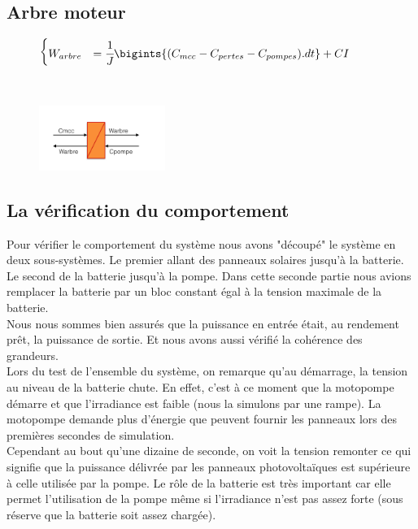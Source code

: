 \subsection{Arbre moteur}
\vspace{-10px}
\begin{figure}[ht]
\centering
\begin{minipage}{.5\textwidth}  
\centering
$\begin{cases}
	 W_{arbre} &= \cfrac{1}{J}\bigints{(C_{mcc}-C_{pertes}-C_{pompes}).dt}+CI
\end{cases}$
\end{minipage}~
\begin{minipage}{.5\textwidth}
  \centering
\includegraphics[height=80px]{images/arbre.png}
\end{minipage}
\end{figure}
\FloatBarrier
\vspace{-20px}


\subsection{La vérification du comportement}

Pour vérifier le comportement du système nous avons "découpé" le système en deux sous-systèmes. Le premier allant des panneaux solaires jusqu'à la batterie. Le second de la batterie jusqu'à la pompe. Dans cette seconde partie nous avions remplacer la batterie par un bloc constant égal à la tension maximale de la batterie.\\
Nous nous sommes bien assurés que la puissance en entrée était, au rendement prêt, la puissance de sortie. Et nous avons aussi vérifié la cohérence des grandeurs.\\

Lors du test de l'ensemble du système, on remarque qu'au démarrage, la tension au niveau de la batterie chute. En effet, c'est à ce moment que la motopompe démarre et que l'irradiance est faible (nous la simulons par une rampe). La motopompe demande plus d’énergie que peuvent fournir les panneaux lors des premières secondes de simulation.\\
Cependant au bout qu'une dizaine de seconde, on voit la tension remonter ce qui signifie que la puissance délivrée par les panneaux photovoltaïques est supérieure à celle utilisée par la pompe. Le rôle de la batterie est très important car elle permet l'utilisation de la pompe même si l'irradiance n'est pas assez forte (sous réserve que la batterie soit assez chargée). 

